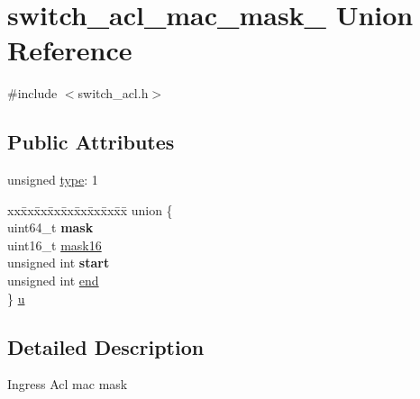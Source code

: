 \hypertarget{unionswitch__acl__mac__mask__}{\section{switch\+\_\+acl\+\_\+mac\+\_\+mask\+\_\+ Union Reference}
\label{unionswitch__acl__mac__mask__}
}


{\ttfamily \#include $<$switch\+\_\+acl.\+h$>$}

\subsection*{Public Attributes}
\begin{DoxyCompactItemize}
\item 
unsigned \hyperlink{unionswitch__acl__mac__mask___a35c723a2a38a9f1df79cfafdf2afbc6b}{type}\+: 1
\item 
\begin{tabbing}
xx\=xx\=xx\=xx\=xx\=xx\=xx\=xx\=xx\=\kill
union \{\\
\>uint64\_t {\bfseries mask}\\
\>uint16\_t \hyperlink{unionswitch__acl__mac__mask___ac479f9e886b148bceb2f1fcd5254cdbe}{mask16}\\
\>unsigned int {\bfseries start}\\
\>unsigned int \hyperlink{unionswitch__acl__mac__mask___a0ca260c767c5ce11d9f8dcc95c11f4ad}{end}\\
\} \hyperlink{unionswitch__acl__mac__mask___a60ee86fb71434de7da92a682a671e48c}{u}\\

\end{tabbing}\end{DoxyCompactItemize}


\subsection{Detailed Description}
Ingress Acl mac mask 

